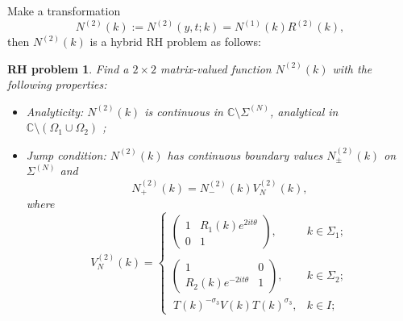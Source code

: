 \documentclass[11pt]{article}
\numberwithin{equation}{section}
\newtheorem{RHP}{RH problem}
\begin{document}
Make  a transformation
\begin{equation} \label{eq45}
N^{(2)}(k):=N^{(2)}(y,t;k)=N^{(1)}(k)R^{(2)}(k),
\end{equation}
then $N^{(2)}(k)$ is a hybrid RH problem as follows:

\begin{RHP}\label{rhp19}
    Find a $2\times 2$ matrix-valued function $N^{(2)}(k)$ with the following properties:
\begin{itemize}
  \item Analyticity: $N^{(2)}(k)$ is continuous in $\mathbb{C}\setminus\Sigma^{(N)}$, analytical in $\mathbb{C}\setminus(\Omega_1\cup\Omega_2)$ ;
  \item Jump condition: $N^{(2)}(k)$ has continuous boundary values $N^{(2)}_{\pm}(k)$ on $\Sigma^{(N)}$ and
 \begin{equation}
N^{(2)}_+(k)=N^{(2)}_-(k)V^{(2)}_N(k),
\end{equation}
where
\begin{equation}
V^{(2)}_N(k)=\left\{\begin{array}{lll}
\left(\begin{array}{cc}
1 & R_{1}(k)e^{2it\theta}\\
0 & 1
\end{array}\right), & k\in \Sigma_{1};\\
\\
\left(\begin{array}{cc}
1 & 0\\
R_{2}(k)e^{-2it\theta} & 1
\end{array}\right),  &k\in \Sigma_{2};\\
\ T(k)^{-\sigma_3}V(k)T(k)^{\sigma_3}, &k\in I;

\end{array}\right.
\end{equation}


\end{itemize}
\end{RHP}
\end{document}
